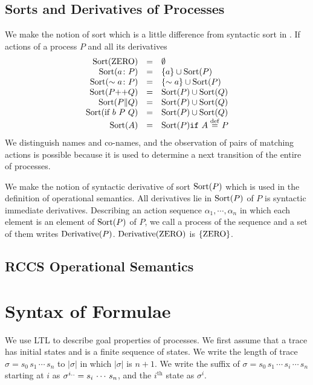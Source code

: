 \documentclass[12pt,a4paper,titlepage]{article}
\theoremstyle{break}
\begin{document}
\subsection{Sorts and Derivatives of Processes}
We make the notion of sort which is a little difference from syntactic sort in \cite{mil:book}.
If actions of a process \(P\) and all its derivatives
  \begin{displaymath}
    \begin{array}{rcl}
\sort{\ZERO}&=&\emptyset\\
\sort{a\colon P}&=&\{a\}\cup\sort{P}\\
\sort{\sim a\colon P}&=&\{\sim a\}\cup\sort{P}\\
\sort{P\mbox{++}Q}&=&\sort{P}\cup\sort{Q}\\
\sort{P\|Q}&=&\sort{P}\cup\sort{Q}\\
\sort{\mbox{if}\ b\ P\ Q}&=&\sort{P}\cup\sort{Q}\\
\sort{A}&=&\sort{P} \mbox{{\tt if} $A\procdef P$}
    \end{array}
  \end{displaymath}
We distinguish names and co-names, and the observation of pairs of matching actions is possible because it is used to determine a next transition of the entire of processes.

We make the notion of syntactic derivative of sort \(\sort{P}\) which is used in the definition of operational semantics.
All derivatives lie in \(\sort{P}\) of \(P\) is syntactic immediate derivatives.
Describing an action sequence \(\alpha_1,\cdots,\alpha_n\) in which each element is an element of \(\sort{P}\) of \(P\), we call a process of the sequence
 and a set of them writes \(\derivative{P}\).
\(\derivative{\ZERO}\) is \(\{\ZERO\}\).
\subsection{RCCS Operational Semantics}\label{sec:OPERATINAL_SEMANTICS}

\section{Syntax of Formulae}
We use LTL to describe goal properties of processes.
We first assume that a trace has initial states and is a finite sequence of states.
We write the length of trace \(\sigma=s_0\,s_1\,\cdots\,s_n\) to \(|\sigma|\) in which \(|\sigma|\) is \(n+1\).
We write the suffix of \(\sigma=s_0\,s_1\,\cdots\,s_i\,\cdots\,s_n\) starting at \(i\) as \(\suffix{\sigma}{i}=s_i\,\cdots\,s_n\), and the \(i^{\mbox{th}}\) state as \(\sigma^i\).
\end{document}
